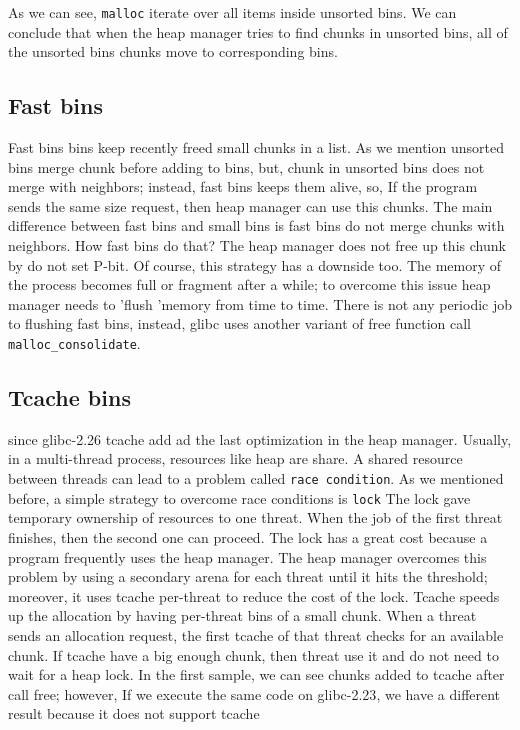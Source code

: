 \documentclass{masterthesis}
\newcommand*\libc{glibc}
\newcommand*\tch{tcache}
\newcommand*\fb{fast bins}
\newcommand*\ub{unsorted bins}
\newcommand*\sbs{small bins}
\newcommand*\Tch{Tcache\xspace}
\newcommand*\Fb{Fast bins\xspace}
\newcommand*\mallocc{\lstinline{malloc}}
\begin{document}
As we can see, \mallocc{} iterate over all items inside \ub{}. We can conclude that when the heap manager tries to find chunks in \ub{}, all of the \ub{} chunks move to corresponding bins.

\subsection{\Fb}
\Fb{} bins keep recently freed small chunks in a list. As we mention \ub{} merge chunk before adding to bins, but, chunk in \ub{} does not merge with neighbors; instead, \fb{} keeps them alive, so, If the program sends the same size request, then heap manager can use this chunks.
The main difference between \fb{} and \sbs{} is \fb{} do not merge chunks with neighbors. How \fb{} do that? The heap manager does not free up this chunk by do not set P-bit. Of course, this strategy has a downside too. The memory of the process becomes full or fragment after a while; to overcome this issue heap manager needs to 'flush 'memory from time to time. There is not any periodic job to flushing \fb{}, instead, \libc{} uses another variant of free function call \lstinline{malloc_consolidate}.

\subsection{\Tch bins}
since \libc{-2.26} \tch{} add ad the last optimization in the heap manager. Usually, in a multi-thread process, resources like heap are share. A shared resource between threads can lead to a problem called \lstinline{race condition}. As we mentioned before, a simple strategy to overcome race conditions is \lstinline{lock} The lock gave temporary ownership of resources to one threat. When the job of the first threat finishes, then the second one can proceed. The lock has a great cost because a program frequently uses the heap manager. The heap manager overcomes this problem by using a secondary arena for each threat until it hits the threshold; moreover, it uses \tch{} per-threat to reduce the cost of the lock. \Tch{} speeds up the allocation by having per-threat bins of a small chunk. When a threat sends an allocation request, the first \tch{} of that threat checks for an available chunk. If \tch{} have a big enough chunk, then threat use it and do not need to wait for a heap lock. In the first sample, we can see chunks added to \tch{} after call free; however, If we execute the same code on \libc{-2.23}, we have a different result because it does not support \tch{}
\end{document}
